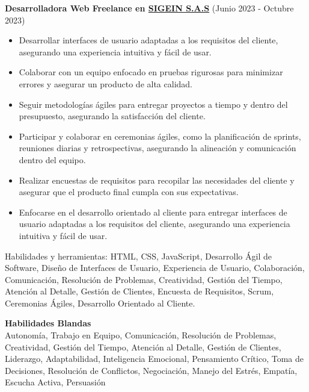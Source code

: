 \vspace*{0.2cm}
\textbf{Desarrolladora Web Freelance en \href{}{SIGEIN S.A.S}} (Junio 2023 - Octubre 2023)
\hfill
\vspace*{0.2cm}
\begin{minipage}{\linewidth}
\begin{itemize}[noitemsep]
    \item Desarrollar interfaces de usuario adaptadas a los requisitos del cliente, asegurando una experiencia intuitiva y fácil de usar.
    \item Colaborar con un equipo enfocado en pruebas rigurosas para minimizar errores y asegurar un producto de alta calidad.
    \item Seguir metodologías ágiles para entregar proyectos a tiempo y dentro del presupuesto, asegurando la satisfacción del cliente.
    \item Participar y colaborar en ceremonias ágiles, como la planificación de sprints, reuniones diarias y retrospectivas, asegurando la alineación y comunicación dentro del equipo.
    \item Realizar encuestas de requisitos para recopilar las necesidades del cliente y asegurar que el producto final cumpla con sus expectativas.
    \item Enfocarse en el desarrollo orientado al cliente para entregar interfaces de usuario adaptadas a los requisitos del cliente, asegurando una experiencia intuitiva y fácil de usar.
\end{itemize}
\hfill
\end{minipage}
Habilidades y herramientas: HTML, CSS, JavaScript, Desarrollo Ágil de Software, Diseño de Interfaces de Usuario, Experiencia de Usuario, Colaboración, Comunicación, Resolución de Problemas, Creatividad, Gestión del Tiempo, Atención al Detalle, Gestión de Clientes, Encuesta de Requisitos, Scrum, Ceremonias Ágiles, Desarrollo Orientado al Cliente.

\noindent\makebox[\linewidth]{\rule{\textwidth}{0.4pt}}

\vspace*{0.2cm}
\textbf{Habilidades Blandas}\\
Autonomía, Trabajo en Equipo, Comunicación, Resolución de Problemas, Creatividad, Gestión del Tiempo, Atención al Detalle, Gestión de Clientes, Liderazgo, Adaptabilidad, Inteligencia Emocional, Pensamiento Crítico, Toma de Decisiones, Resolución de Conflictos, Negociación, Manejo del Estrés, Empatía, Escucha Activa, Persuasión\\

